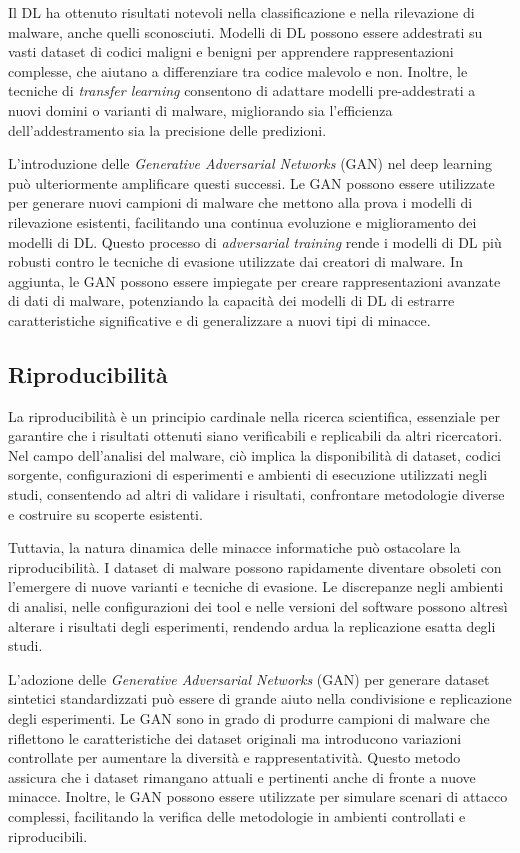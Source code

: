 Il DL ha ottenuto risultati notevoli nella classificazione e nella rilevazione di malware, anche quelli sconosciuti. Modelli di DL possono essere addestrati su vasti dataset di codici maligni e benigni per apprendere rappresentazioni complesse, che aiutano a differenziare tra codice malevolo e non. Inoltre, le tecniche di \emph{transfer learning} consentono di adattare modelli pre-addestrati a nuovi domini o varianti di malware, migliorando sia l'efficienza dell'addestramento sia la precisione delle predizioni.

L'introduzione delle \emph{Generative Adversarial Networks} (GAN) nel deep learning può ulteriormente amplificare questi successi. Le GAN possono essere utilizzate per generare nuovi campioni di malware che mettono alla prova i modelli di rilevazione esistenti, facilitando una continua evoluzione e miglioramento dei modelli di DL. Questo processo di \emph{adversarial training} rende i modelli di DL più robusti contro le tecniche di evasione utilizzate dai creatori di malware. In aggiunta, le GAN possono essere impiegate per creare rappresentazioni avanzate di dati di malware, potenziando la capacità dei modelli di DL di estrarre caratteristiche significative e di generalizzare a nuovi tipi di minacce.

\subsection{Riproducibilità}

La riproducibilità è un principio cardinale nella ricerca scientifica, essenziale per garantire che i risultati ottenuti siano verificabili e replicabili da altri ricercatori. Nel campo dell'analisi del malware, ciò implica la disponibilità di dataset, codici sorgente, configurazioni di esperimenti e ambienti di esecuzione utilizzati negli studi, consentendo ad altri di validare i risultati, confrontare metodologie diverse e costruire su scoperte esistenti.

Tuttavia, la natura dinamica delle minacce informatiche può ostacolare la riproducibilità. I dataset di malware possono rapidamente diventare obsoleti con l'emergere di nuove varianti e tecniche di evasione. Le discrepanze negli ambienti di analisi, nelle configurazioni dei tool e nelle versioni del software possono altresì alterare i risultati degli esperimenti, rendendo ardua la replicazione esatta degli studi.

L'adozione delle \emph{Generative Adversarial Networks} (GAN) per generare dataset sintetici standardizzati può essere di grande aiuto nella condivisione e replicazione degli esperimenti. Le GAN sono in grado di produrre campioni di malware che riflettono le caratteristiche dei dataset originali ma introducono variazioni controllate per aumentare la diversità e rappresentatività. Questo metodo assicura che i dataset rimangano attuali e pertinenti anche di fronte a nuove minacce. Inoltre, le GAN possono essere utilizzate per simulare scenari di attacco complessi, facilitando la verifica delle metodologie in ambienti controllati e riproducibili.

